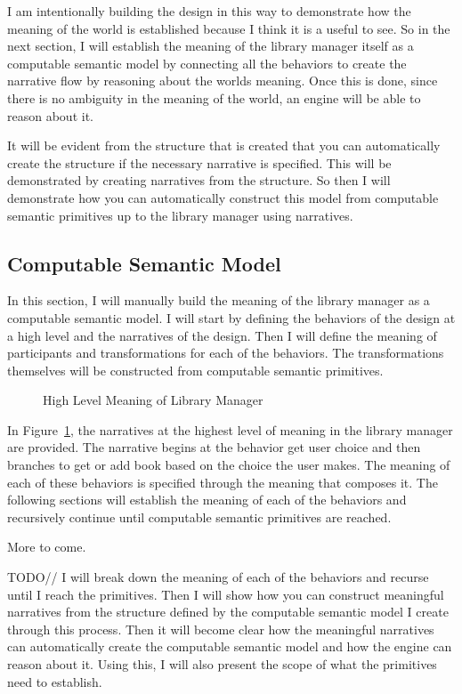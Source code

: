 I am intentionally building the design in this way to demonstrate how the meaning of the world is established because I think it is a useful to see. So in the next section, I will establish the meaning of the library manager itself as a computable semantic model by connecting all the behaviors to create the narrative flow by reasoning about the worlds meaning. Once this is done, since there is no ambiguity in the meaning of the world, an engine will be able to reason about it.

It will be evident from the structure that is created that you can automatically create the structure if the necessary narrative is specified. This will be demonstrated by creating narratives from the structure. So then I will demonstrate how you can automatically construct this model from computable semantic primitives up to the library manager using narratives.

\subsection{Computable Semantic Model}

In this section, I will manually build the meaning of the library manager as a computable semantic model. I will start by defining the behaviors of the design at a high level and the narratives of the design. Then I will define the meaning of participants and transformations for each of the behaviors. The transformations themselves will be constructed from computable semantic primitives.

\begin{figure}[htbp]
    \centering
    
    \caption{High Level Meaning of Library Manager}
    \label{fig:lib_man_narratives}
\end{figure}

In Figure~\ref{fig:lib_man_narratives}, the narratives at the highest level of meaning in the library manager are provided. The narrative begins at the behavior get user choice and then branches to get or add book based on the choice the user makes. The meaning of each of these behaviors is specified through the meaning that composes it. The following sections will establish the meaning of each of the behaviors and recursively continue until computable semantic primitives are reached.

More to come. 

TODO// 
I will break down the meaning of each of the behaviors and recurse until I reach the primitives. Then I will show how you can construct meaningful narratives from the structure defined by the computable semantic model I create through this process. Then it will become clear how the meaningful narratives can automatically create the computable semantic model and how the engine can reason about it. Using this, I will also present the scope of what the primitives need to establish.

